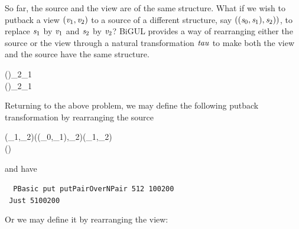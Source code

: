 So far, the source and the view are of the same structure. What if we
wish to putback a view \ensuremath{(\Varid{v}_{1},\Varid{v}_{2})} to a source of a different structure,
say \ensuremath{((\Varid{s}_{0},\Varid{s}_{1}),\Varid{s}_{2}))}, to replace \ensuremath{\Varid{s}_{1}} by \ensuremath{\Varid{v}_{1}} and
\ensuremath{\Varid{s}_{2}} by \ensuremath{\Varid{v}_{2}}? BiGUL provides a way of 
rearranging either the source
or the view through a natural transformation \ensuremath{\Varid{tau}} to make both the view and
the source have the same structure.
\begin{hscode}\SaveRestoreHook
{}%
%
%
\>[3]{}\mathbin{\$}()\mathbin{::}\;_{2}\;\to {}\;_{1}\;\<[E]%
\\
\>[3]{}\mathbin{\$}()\mathbin{::}\;\;_{2}\to {}\;\;_{1}{}\<[E]%
\ColumnHook
\end{hscode}\resethooks
Returning to the above problem, we may define the following
putback transformation by rearranging the source
\begin{hscode}\SaveRestoreHook
{}%
%
\>[B]{}\mathbin{::}(\;_{1},\;_{2})\Rightarrow {}\;((_{0},_{1}),_{2})\;(_{1},_{2}){}\<[E]%
\\
\>[B]{}\mathrel{=}\mathbin{\$}()\;\<[E]%
\ColumnHook
\end{hscode}\resethooks
and have
\begin{tabbing}\tt
~PBasic~put~putPairOverNPair~512~100200\\
\tt ~Just~5100200
\end{tabbing}
Or we may define it by rearranging the view:
